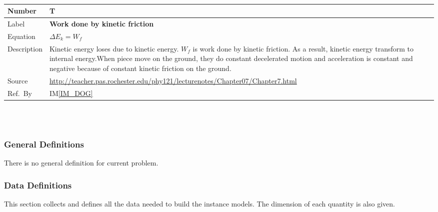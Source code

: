 \documentclass[12pt]{article}
\newcommand{\colAwidth}{0.13\textwidth}
\newcommand{\colBwidth}{0.82\textwidth}
\newcounter{theorynum} %
\newcommand{\iref}[1]{IM\ref{#1}}
\begin{document}
	~\newline
	
	\noindent
	\begin{minipage}{\textwidth}
		\renewcommand*{\arraystretch}{1.5}
		\begin{tabular}{| p{\colAwidth} | p{\colBwidth}|}
			\hline
			\rowcolor[gray]{0.9}
			Number& T{theorynum}\thetheorynum \label{T_WKF}\\
			\hline
			Label&\bf Work done by kinetic friction\\
			\hline
			Equation&  $\Delta E_{k}=W_{f}$\\
			\hline
			
			Description & 
			Kinetic energy loses due to kinetic energy. $W_{f}$ is work done by kinetic friction. As a result, kinetic energy transform to internal energy.When piece move on the ground, they do constant decelerated motion and acceleration is constant and negative because of constant kinetic friction on the ground.\\
			\hline
			Source &
			\url{http://teacher.pas.rochester.edu/phy121/lecturenotes/Chapter07/Chapter7.html}\\
			\hline
			Ref.\ By & \iref{IM_DOG}\\
			\hline
		\end{tabular}
	\end{minipage}\\
	
	~\newline
	
	\subsubsection{General Definitions}\label{sec_gendef}
	
	There is no general definition for current problem.
	
	\subsubsection{Data Definitions}\label{sec_datadef}
	
	This section collects and defines all the data needed to build the instance
	models. The dimension of each quantity is also given. 
	
	~\newline
	
\end{document}
